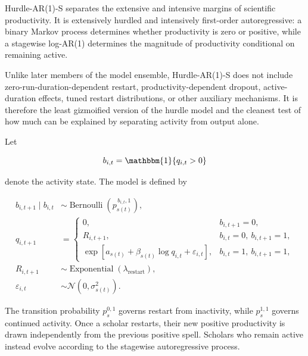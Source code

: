 \documentclass[twocolumn, letterpaper]{article}
\begin{document}
Hurdle-AR(1)-S separates the extensive and intensive margins of scientific productivity. It is extensively hurdled and intensively first-order autoregressive: a binary Markov process determines whether productivity is zero or positive, while a stagewise log-AR(1) determines the magnitude of productivity conditional on remaining active.

Unlike later members of the model ensemble, Hurdle-AR(1)-S does not include zero-run-duration-dependent restart, productivity-dependent dropout, active-duration effects, tuned restart distributions, or other auxiliary mechanisms. It is therefore the least gizmoified version of the hurdle model and the cleanest test of how much can be explained by separating activity from output alone.

Let

\[
b_{i,t}=\mathbbm{1}\{q_{i,t}>0\}
\]

denote the activity state. The model is defined by

\begin{equation}
    \begin{aligned}
        b_{i,t+1}\mid b_{i,t}
            &\sim
            \operatorname{Bernoulli}
            \left(
                p_{s(t)}^{\,b_{i,t},1}
            \right), \\[4pt]
        q_{i,t+1}
            &=
            \begin{cases}
                0,
                    & b_{i,t+1}=0, \\[4pt]
                R_{i,t+1},
                    & b_{i,t}=0,\ b_{i,t+1}=1, \\[4pt]
                \exp\left[
                    a_{s(t)}
                    +\beta_{s(t)}\log q_{i,t}
                    +\varepsilon_{i,t}
                \right],
                    & b_{i,t}=1,\ b_{i,t+1}=1,
            \end{cases}\\[6pt]
        R_{i,t+1}
            &\sim
            \operatorname{Exponential}
            (\lambda_{\mathrm{restart}}), \\[4pt]
        \varepsilon_{i,t}
            &\sim
            \mathcal{N}
            \left(
                0,\sigma_{s(t)}^2
            \right).
    \end{aligned}
\label{eq:hurdle_ar1_grw_s}
\end{equation}

The transition probability \(p_s^{0,1}\) governs restart from inactivity, while \(p_s^{1,1}\) governs continued activity. Once a scholar restarts, their new positive productivity is drawn independently from the previous positive spell. Scholars who remain active instead evolve according to the stagewise autoregressive process.
\end{document}
